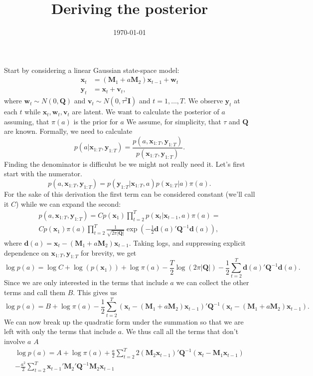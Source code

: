 \documentclass[a4paper,12pt]{article} %
\title{Deriving the posterior}
\date{\today} %
\newcommand{\bx}{\bm{x}}
\newcommand{\by}{\bm{y}}
\newcommand{\bM}{\bm{M}}
\newcommand{\bQ}{\bm{Q}}
\newcommand{\bI}{\bm{I}}
\newcommand{\bw}{\bm{w}}
\newcommand{\bv}{\bm{v}}
\newcommand{\bd}{\bm{d}}
\begin{document}
\maketitle

Start by considering a linear Gaussian state-space model:
\begin{align*}
\bx_t &= (\bM_1 + a\bM_2)\bx_{t - 1} + \bw_t\\
\by_t &= \bx_t + \bv_t,
\end{align*}
where $\bw_t \sim N(0, \bQ)$ and $\bv_t \sim N(0, \tau^2\bI)$ and $t = 1, \dots, T$. We observe $\by_t$ at each $t$ while $\bx_t, \bw_t, \bv_t$ are latent. We want to calculate the posterior of $a$ assuming, that $\pi(a)$ is the prior for $a$ We assume, for simplicity, that $\tau$ and $\bQ$ are known. Formally, we need to calculate
\begin{equation}
  p(a|\bx_{1:T}, \by_{1:T}) = \frac{p(a, \bx_{1:T}, \by_{1:T})}{p(\bx_{1:T}, \by_{1:T})}. 
\end{equation}
Finding the denominator is difficulut be we might not really need it. Let's first start with the numerator.
$$
p(a, \bx_{1:T}, \by_{1:T}) = p(\by_{1:T} | \bx_{1:T}, a) p(\bx_{1:T}|a) \pi(a).
$$
For the sake of this derivation the first term can be considered constant (we'll call it $C$) while we can expand the second:
\begin{multline*}
  p(a, \bx_{1:T}, \by_{1:T}) = Cp(\bx_1)\prod_{t=2}^Tp(\bx_t|\bx_{t-1}, a) \pi(a) = \\
  Cp(\bx_1)\pi(a) \prod_{t=2}^T \frac{1}{\sqrt{2\pi|\bQ|}} \exp\left(-\frac{1}{2}\bd(a)'\bQ^{-1}\bd(a)\right),
\end{multline*}
where $\bd(a) = \bx_t - (\bM_1 + a\bM_2)\bx_{t-1}$.
Taking logs, and suppressing explicit dependence on $\bx_{1:T}, \by_{1:T}$ for brevity, we get
$$
\log p(a) = \log C + \log(p(\bx_1)) + \log \pi(a) - \frac{T}{2}\log (2\pi |\bQ|) - \frac{1}{2}\sum_{t=2}^T \bd(a)'\bQ^{-1}\bd(a).
$$
Since we are only interested in the terms that include $a$ we can collect the other terms and call them $B$. This gives us
$$
\log p(a) = B + \log \pi(a) -\frac{1}{2} \sum_{t=2}^T \left(\bx_t - (\bM_1 + a\bM_2)\bx_{t-1}\right)'\bQ^{-1} \left(\bx_t - (\bM_1 + a\bM_2)\bx_{t-1}\right).
$$
We can now break up the quadratic form under the summation so that we are left with only the terms that include $a$. We thus call all the terms that don't involve $a$ $A$
\begin{multline}
  \log p(a) = A + \log \pi(a) +\frac{a}{2} \sum_{t=2}^T 2\left(\bM_2\bx_{t-1}\right)'\bQ^{-1}\left(\bx_t - \bM_1\bx_{t-1}\right) \\
  -\frac{a^2}{2}\sum_{t=2}^T \bx_{t-1}'\bM_2'\bQ^{-1}\bM_2\bx_{t-1}
\end{multline}
\end{document}
